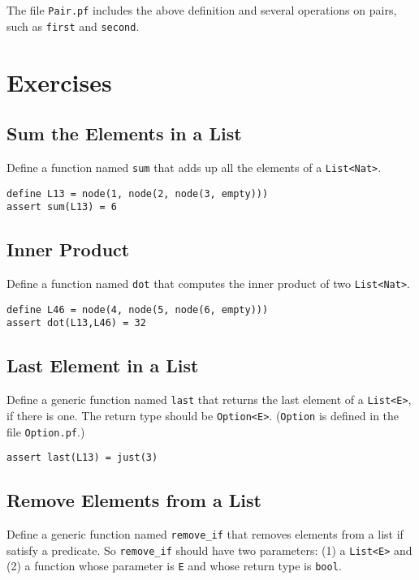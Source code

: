 \documentclass[12pt]{article}
\begin{document}
The file \texttt{Pair.pf} includes the above definition and several
operations on pairs, such as \texttt{first} and \texttt{second}.

\section{Exercises}

\subsection{Sum the Elements in a List}

Define a function named \texttt{sum} that adds up all the elements of a \texttt{List<Nat>}.

\begin{verbatim}
define L13 = node(1, node(2, node(3, empty)))
assert sum(L13) = 6
\end{verbatim}

\subsection{Inner Product}

Define a function named \texttt{dot} that computes the inner product of two \texttt{List<Nat>}.

\begin{verbatim}
define L46 = node(4, node(5, node(6, empty)))
assert dot(L13,L46) = 32
\end{verbatim}

\subsection{Last Element in a List}

Define a generic function named \texttt{last} that returns the last element
of a \texttt{List<E>}, if there is one. The return type should be \texttt{Option<E>}.
(\texttt{Option} is defined in the file \texttt{Option.pf}.)

\begin{verbatim}
assert last(L13) = just(3)
\end{verbatim}

\subsection{Remove Elements from a List}

Define a generic function named \texttt{remove\_if} that removes elements
from a list if satisfy a predicate. So \texttt{remove\_if} should have two
parameters: (1) a \texttt{List<E>} and (2) a function whose parameter is \texttt{E} 
and whose return type is \texttt{bool}.
\end{document}
